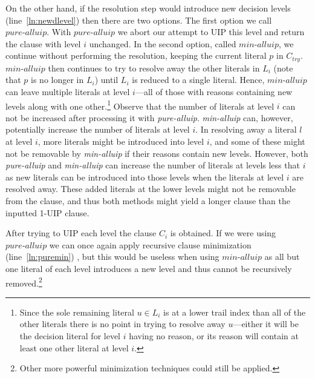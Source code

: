 \documentclass[runningheads]{llncs}
\newcommand{\oneuip}{1-UIP\xspace}
\newcommand{\allUipPure}{\textit{pure-alluip}\xspace}
\newcommand{\allUipMin}{\textit{min-alluip}\xspace}
\newcommand{\ctry}{C_{\mathit{try}}}
\begin{document}
On the other hand, if the resolution step would introduce new decision
levels (line~\ref{ln:newdlevel}) then there are two options.  The
first option we call $\allUipPure$. With $\allUipPure$ we abort our
attempt to UIP this level and return the clause with level $i$
unchanged. In the second option, called $\allUipMin$, we continue
without performing the resolution, keeping the current literal $p$ in
$\ctry$. $\allUipMin$ then continues to try to resolve away the other
literals in $L_i$ (note that $p$ is no longer in $L_i$) until $L_i$ is
reduced to a single literal. Hence, $\allUipMin$ can leave multiple
literals at level $i$---all of those with reasons containing new
levels along with one other.\footnote{Since the sole remaining literal
  $u\in L_i$ is at a lower trail index than all of the other literals
  there is no point in trying to resolve away $u$---either it will be
  the decision literal for level $i$ having no reason, or its reason
  will contain at least one other literal at level $i$.} Observe that
the number of literals at level $i$ can not be increased after
processing it with \allUipPure. \allUipMin can, however, potentially
increase the number of literals at level $i$. In resolving away a
literal $l$ at level $i$, more literals might be introduced into level
$i$, and some of these might not be removable by \allUipMin if their
reasons contain new levels. However, both \allUipPure and \allUipMin
can increase the number of literals at levels less that $i$ as new
literals can be introduced into those levels when the literals at
level $i$ are resolved away. These added literals at the lower levels
might not be removable from the clause, and thus both methods might
yield a longer clause than the inputted \oneuip clause.

After trying to UIP each level the clause $C_i$ is obtained. If we
were using $\allUipPure$ we can once again apply recursive clause
minimization (line~\ref{ln:puremin})
\cite{DBLP:conf/sat/SorenssonB09}, but this would be useless when
using $\allUipMin$ as all but one literal of each level introduces a
new level and thus cannot be recursively removed.\footnote{Other more
  powerful minimization techniques could still be applied.}

\end{document}
